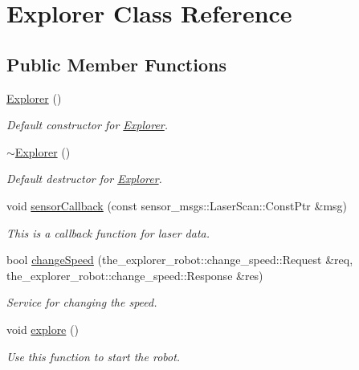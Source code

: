 \hypertarget{classExplorer}{}\section{Explorer Class Reference}
\label{classExplorer}
\subsection*{Public Member Functions}
\begin{DoxyCompactItemize}
\item 
\mbox{\hyperlink{classExplorer_acbedef0262785b6983d1fe9b4f2c6242}{Explorer}} ()
\begin{DoxyCompactList}\small\item\em Default constructor for \mbox{\hyperlink{classExplorer}{Explorer}}. \end{DoxyCompactList}\item 
\mbox{\hyperlink{classExplorer_aa1b0a71e92e003e9162a5ba99d843392}{$\sim$\+Explorer}} ()
\begin{DoxyCompactList}\small\item\em Default destructor for \mbox{\hyperlink{classExplorer}{Explorer}}. \end{DoxyCompactList}\item 
void \mbox{\hyperlink{classExplorer_a99a6215e70f2449189b0a3cb7ec12994}{sensor\+Callback}} (const sensor\+\_\+msgs\+::\+Laser\+Scan\+::\+Const\+Ptr \&msg)
\begin{DoxyCompactList}\small\item\em This is a callback function for laser data. \end{DoxyCompactList}\item 
bool \mbox{\hyperlink{classExplorer_aa860260292752413282de7f9d9ddfbc2}{change\+Speed}} (the\+\_\+explorer\+\_\+robot\+::change\+\_\+speed\+::\+Request \&req, the\+\_\+explorer\+\_\+robot\+::change\+\_\+speed\+::\+Response \&res)
\begin{DoxyCompactList}\small\item\em Service for changing the speed. \end{DoxyCompactList}\item 
void \mbox{\hyperlink{classExplorer_a246ceb49142bbd15bdbdc3b900269294}{explore}} ()
\begin{DoxyCompactList}\small\item\em Use this function to start the robot. \end{DoxyCompactList}\end{DoxyCompactItemize}
